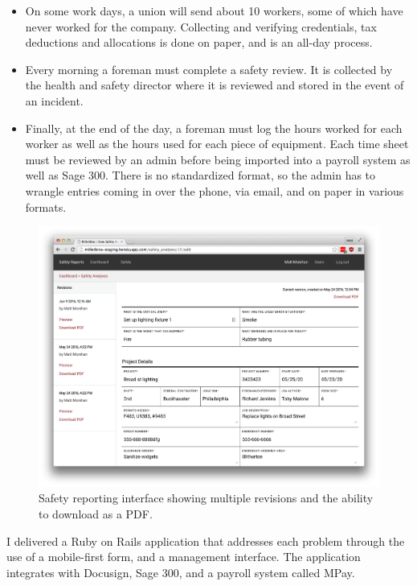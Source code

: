 \documentclass{tufte-handout}
\begin{document}
\begin{itemize}
\itemsep-0.1em
\item{On some work days, a union will send about 10 workers, some of which have never worked for the company. Collecting and verifying credentials, tax deductions and allocations is done on paper, and is an all-day process.}
\item{Every morning a foreman must complete a safety review. It is collected by the health and safety director where it is reviewed and stored in the event of an incident.}
\item{Finally, at the end of the day, a foreman must log the hours worked for each worker as well as the hours used for each piece of equipment. Each time sheet must be reviewed by an admin before being imported into a payroll system as well as Sage 300. There is no standardized format, so the admin has to wrangle entries coming in over the phone, via email, and on paper in various formats.}
\end{itemize}
\smallskip

\begin{figure}%
  \includegraphics[width=\linewidth]{safety_report_item}
  \caption{Safety reporting interface showing multiple revisions and the ability to download as a PDF.}
  \label{fig:safety_report_item}
\end{figure}

I delivered a Ruby on Rails application that addresses each problem through the use of a mobile-first form, and a management interface. The application integrates with Docusign, Sage 300, and a payroll system called MPay.
\end{document}

